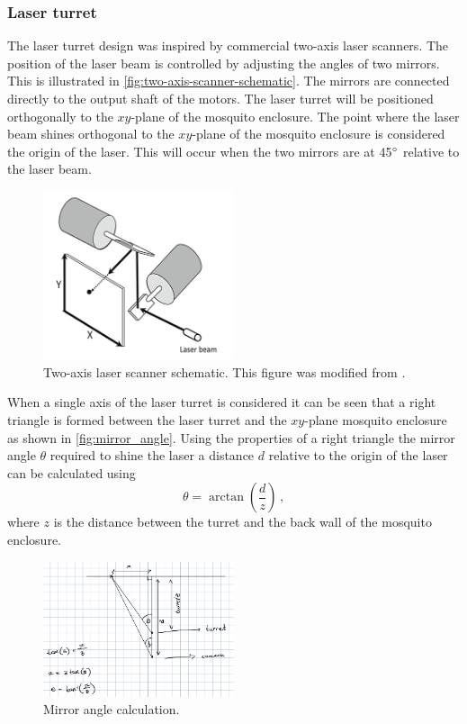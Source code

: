 \subsubsection{Laser turret}\label{subsubsec:laser_turret_design}
The laser turret design was inspired by commercial two-axis laser scanners. The position of the laser beam is controlled by adjusting the angles of two mirrors. This is illustrated in \autoref{fig:two-axis-scanner-schematic}. The mirrors are connected directly to the output shaft of the motors. The laser turret will be positioned orthogonally to the $xy$-plane of the mosquito enclosure. The point where the laser beam shines orthogonal to the $xy$-plane of the mosquito enclosure is considered the origin of the laser. This will occur when the two mirrors are at 45$^{\circ}$ relative to the laser beam.
\begin{figure}[h]
    \centering
    \includegraphics[width=0.5\textwidth]{figures/hardware_design/two_axis_scanner.png}
    \caption{Two-axis laser scanner schematic. This figure was modified from \cite{two-axis-scanner-schematic}.}
    \label{fig:two-axis-scanner-schematic}
\end{figure}

When a single axis of the laser turret is considered it can be seen that a right triangle is formed between the laser turret and the $xy$-plane mosquito enclosure as shown in \autoref{fig:mirror_angle}. Using the properties of a right triangle the mirror angle $\theta$ required to shine the laser a distance $d$ relative to the origin of the laser can be calculated using
\begin{equation}
    \theta = \arctan{\left(\frac{d}{z}\right)}\,,
    \label{eq:mirror_angle}
\end{equation}
where $z$ is the distance between the turret and the back wall of the mosquito enclosure.
\begin{figure}[h]
    \centering
    \includegraphics[width=0.5\textwidth]{figures/hardware_design/mirror_angle.png}
    \caption{Mirror angle calculation.}
    \label{fig:mirror_angle}
\end{figure}

